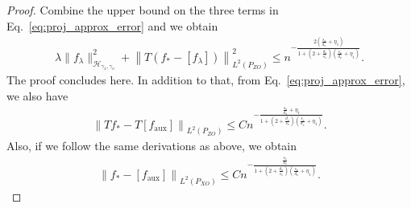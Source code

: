 \documentclass[11pt]{article}
\newcommand{\calH}{\mathcal{H}}
\newcommand{\0}{\mathbf{0}}
\begin{document}
\begin{appendix}
\begin{proof}
Combine the upper bound on the three terms in Eq.~\eqref{eq:proj_approx_error} and we obtain
\begin{align}\label{eq:lambda_f_lambda_T_L2}
    \lambda \| f_\lambda\|_{\calH_{\gamma_x,\gamma_o}}^2 + \left\|T\left(f_{\ast} - \left[f_{\lambda}\right]\right)\right\|_{L^2(P_{ZO})}^2 \leq n^{-\frac{2(\frac{s_x}{d_x}+\eta_1)}{1+(2+\frac{d_o}{s_o})(\frac{s_x}{d_x}+\eta_1)}}.
\end{align}
The proof concludes here.
In addition to that, from Eq.~\eqref{eq:proj_approx_error}, we also have
\begin{align}\label{eq:Tf_Tf_aux}
    \left\|Tf_{\ast} - T[f_{\mathrm{aux}}]\right\|_{L^2(P_{ZO})} \leq C n^{-\frac{\frac{s_x}{d_x}+\eta_1}{1+(2+\frac{d_o}{s_o})(\frac{s_x}{d_x}+\eta_1)}} .
\end{align}
Also, if we follow the same derivations as above, we obtain
\begin{align}\label{eq:f_f_aux_diff}
    \left\|f_{\ast} - [f_{\mathrm{aux}}] \right\|_{L^2(P_{XO})} \leq C n^{-\frac{\frac{s_x}{d_x}}{1+(2+\frac{d_o}{s_o})(\frac{s_x}{d_x}+\eta_1)}} .
\end{align}
\end{proof}




\end{appendix}
\end{document}
